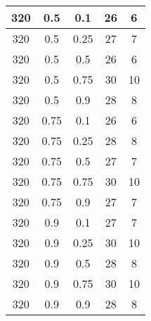 \documentclass{bmstu}
\begin{document}
\begin{center}
\begin{longtable}[c]{|c|c|c|c|c|}
320 & 0.5 & 0.1 & 26 & 6 \\\hline
320 & 0.5 & 0.25 & 27 & 7 \\\hline
320 & 0.5 & 0.5 & 26 & 6 \\\hline
320 & 0.5 & 0.75 & 30 & 10 \\\hline
320 & 0.5 & 0.9 & 28 & 8 \\\hline
320 & 0.75 & 0.1 & 26 & 6 \\\hline
320 & 0.75 & 0.25 & 28 & 8 \\\hline
320 & 0.75 & 0.5 & 27 & 7 \\\hline
320 & 0.75 & 0.75 & 30 & 10 \\\hline
320 & 0.75 & 0.9 & 27 & 7 \\\hline
320 & 0.9 & 0.1 & 27 & 7 \\\hline
320 & 0.9 & 0.25 & 30 & 10 \\\hline
320 & 0.9 & 0.5 & 28 & 8 \\\hline
320 & 0.9 & 0.75 & 30 & 10 \\\hline
320 & 0.9 & 0.9 & 28 & 8 \\\hline
	\end{longtable}
\end{center}
\end{document}
